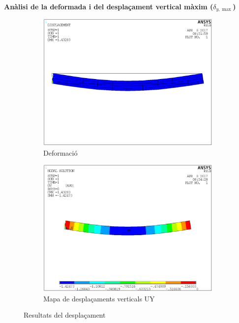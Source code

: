 \documentclass[a4paper]{article}
\def\imgS{0.42\textwidth}
\begin{document}
\textbf{Anàlisi de la deformada i del desplaçament vertical màxim ($\delta_{y, \max}$)}
\begin{figure}[H]
	\begin{subfigure}{\imgS}
		\includegraphics[width=\textwidth]{images/40_deformed}
		\caption{Deformació}
		\label{fig:40_deformed}
	\end{subfigure}
	\hfill
	\begin{subfigure}{\imgS}
		\includegraphics[width=\textwidth]{images/40_UY}
		\caption{Mapa de desplaçaments verticals UY}
		\label{fig:40_UY}
	\end{subfigure}
	\caption{Resultats del desplaçament}
	\label{fig:40_displacement}
\end{figure}
\end{document}
